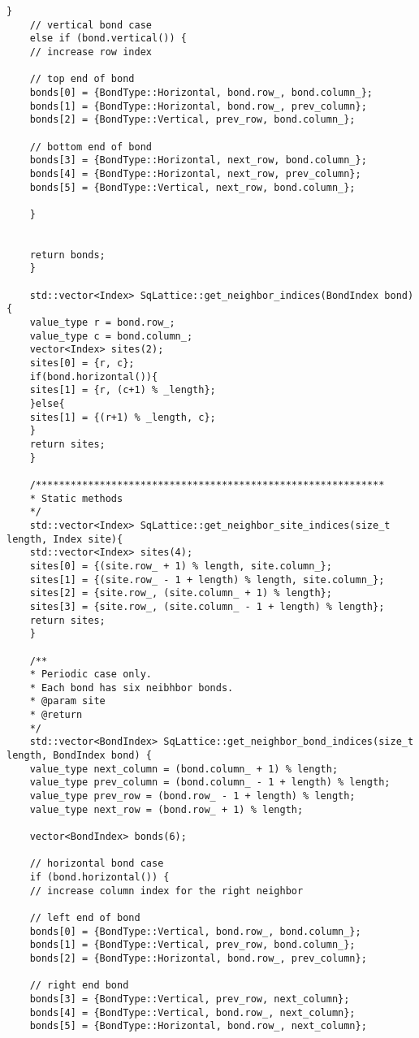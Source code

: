 \begin{lstlisting}[style=CStyle]
	}
	// vertical bond case
	else if (bond.vertical()) {
	// increase row index
	
	// top end of bond
	bonds[0] = {BondType::Horizontal, bond.row_, bond.column_};
	bonds[1] = {BondType::Horizontal, bond.row_, prev_column};
	bonds[2] = {BondType::Vertical, prev_row, bond.column_};
	
	// bottom end of bond
	bonds[3] = {BondType::Horizontal, next_row, bond.column_};
	bonds[4] = {BondType::Horizontal, next_row, prev_column};
	bonds[5] = {BondType::Vertical, next_row, bond.column_};
	
	}
	
	
	return bonds;
	}
	
	std::vector<Index> SqLattice::get_neighbor_indices(BondIndex bond) {
	value_type r = bond.row_;
	value_type c = bond.column_;
	vector<Index> sites(2);
	sites[0] = {r, c};
	if(bond.horizontal()){
	sites[1] = {r, (c+1) % _length};
	}else{
	sites[1] = {(r+1) % _length, c};
	}
	return sites;
	}
	
	/************************************************************
	* Static methods
	*/
	std::vector<Index> SqLattice::get_neighbor_site_indices(size_t length, Index site){
	std::vector<Index> sites(4);
	sites[0] = {(site.row_ + 1) % length, site.column_};
	sites[1] = {(site.row_ - 1 + length) % length, site.column_};
	sites[2] = {site.row_, (site.column_ + 1) % length};
	sites[3] = {site.row_, (site.column_ - 1 + length) % length};
	return sites;
	}
	
	/**
	* Periodic case only.
	* Each bond has six neibhbor bonds.
	* @param site
	* @return
	*/
	std::vector<BondIndex> SqLattice::get_neighbor_bond_indices(size_t length, BondIndex bond) {
	value_type next_column = (bond.column_ + 1) % length;
	value_type prev_column = (bond.column_ - 1 + length) % length;
	value_type prev_row = (bond.row_ - 1 + length) % length;
	value_type next_row = (bond.row_ + 1) % length;
	
	vector<BondIndex> bonds(6);
	
	// horizontal bond case
	if (bond.horizontal()) {
	// increase column index for the right neighbor
	
	// left end of bond
	bonds[0] = {BondType::Vertical, bond.row_, bond.column_};
	bonds[1] = {BondType::Vertical, prev_row, bond.column_};
	bonds[2] = {BondType::Horizontal, bond.row_, prev_column};
	
	// right end bond
	bonds[3] = {BondType::Vertical, prev_row, next_column};
	bonds[4] = {BondType::Vertical, bond.row_, next_column};
	bonds[5] = {BondType::Horizontal, bond.row_, next_column};
	

\end{lstlisting}
